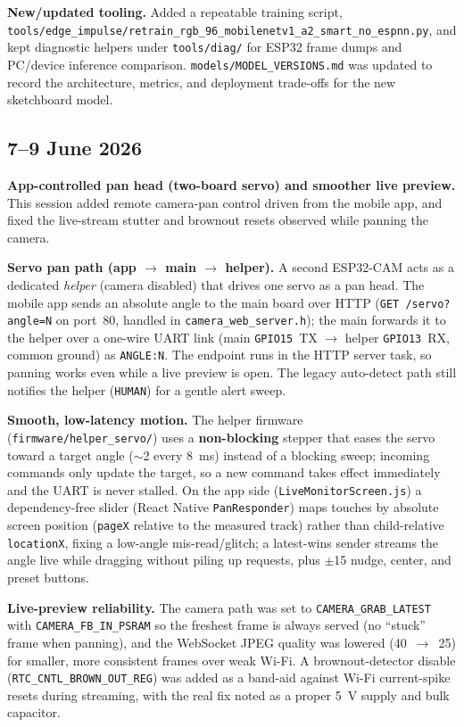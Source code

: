 \documentclass[11pt,a4paper]{article}
\begin{document}
\textbf{New/updated tooling.} Added a repeatable training script, \texttt{tools/edge\_impulse/retrain\_rgb\_96\_mobilenetv1\_a2\_smart\_no\_espnn.py}, and kept diagnostic helpers under \texttt{tools/diag/} for ESP32 frame dumps and PC/device inference comparison. \texttt{models/MODEL\_VERSIONS.md} was updated to record the architecture, metrics, and deployment trade-offs for the new sketchboard model.

\subsection{7--9 June 2026}
\textbf{App-controlled pan head (two-board servo) and smoother live preview.} This session added remote camera-pan control driven from the mobile app, and fixed the live-stream stutter and brownout resets observed while panning the camera.

\textbf{Servo pan path (app $\rightarrow$ main $\rightarrow$ helper).} A second ESP32-CAM acts as a dedicated \emph{helper} (camera disabled) that drives one servo as a pan head. The mobile app sends an absolute angle to the main board over HTTP (\texttt{GET /servo?angle=N} on port~80, handled in \texttt{camera\_web\_server.h}); the main forwards it to the helper over a one-wire UART link (main \texttt{GPIO15}~TX $\rightarrow$ helper \texttt{GPIO13}~RX, common ground) as \texttt{ANGLE:N}. The endpoint runs in the HTTP server task, so panning works even while a live preview is open. The legacy auto-detect path still notifies the helper (\texttt{HUMAN}) for a gentle alert sweep.

\textbf{Smooth, low-latency motion.} The helper firmware (\texttt{firmware/helper\_servo/}) uses a \textbf{non-blocking} stepper that eases the servo toward a target angle ($\sim$2\textdegree{} every 8~ms) instead of a blocking sweep; incoming commands only update the target, so a new command takes effect immediately and the UART is never stalled. On the app side (\texttt{LiveMonitorScreen.js}) a dependency-free slider (React Native \texttt{PanResponder}) maps touches by absolute screen position (\texttt{pageX} relative to the measured track) rather than child-relative \texttt{locationX}, fixing a low-angle mis-read/glitch; a latest-wins sender streams the angle live while dragging without piling up requests, plus $\pm$15\textdegree{} nudge, center, and preset buttons.

\textbf{Live-preview reliability.} The camera path was set to \texttt{CAMERA\_GRAB\_LATEST} with \texttt{CAMERA\_FB\_IN\_PSRAM} so the freshest frame is always served (no ``stuck'' frame when panning), and the WebSocket JPEG quality was lowered (40~$\rightarrow$~25) for smaller, more consistent frames over weak Wi-Fi. A brownout-detector disable (\texttt{RTC\_CNTL\_BROWN\_OUT\_REG}) was added as a band-aid against Wi-Fi current-spike resets during streaming, with the real fix noted as a proper 5~V supply and bulk capacitor.
\end{document}
